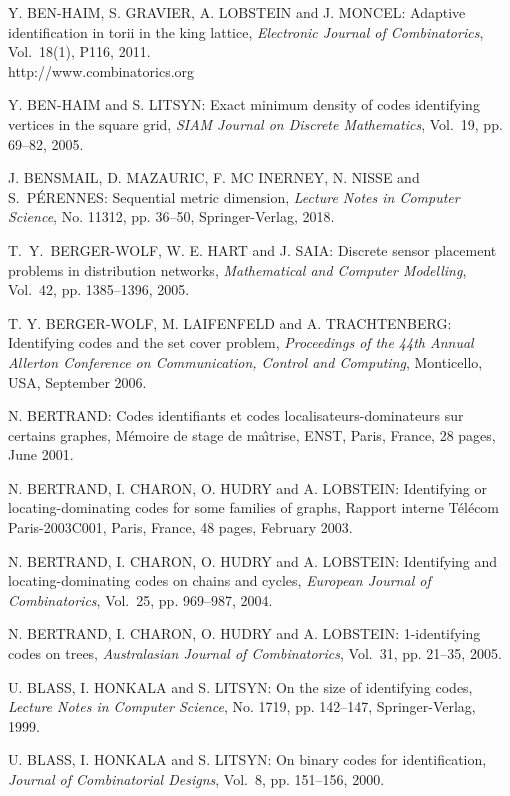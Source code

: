 \begin{thebibliography}{999}
Y. BEN-HAIM, S. GRAVIER, A. LOBSTEIN and J. MONCEL: Adaptive identification in torii in the king lattice, {\it Electronic Journal of Combinatorics}, Vol.~18(1), P116, 2011.\\
http://www.combinatorics.org

Y. BEN-HAIM and S. LITSYN: Exact minimum density of codes identifying vertices in the square grid, {\it SIAM Journal on Discrete Mathematics}, Vol.~19, pp. 69--82, 2005.

J. BENSMAIL, D. MAZAURIC, F. MC INERNEY, N. NISSE and S.~P\'E\-RENNES: Sequential metric dimension, {\it Lecture Notes in Computer Science}, No. 11312, pp. 36--50, Springer-Verlag, 2018.

%
T.~Y.~BERGER-WOLF, W. E. HART and J. SAIA: Discrete sensor placement problems in distribution networks, {\it Mathematical and Computer Modelling}, Vol.~42, pp. 1385--1396, 2005.

T. Y. BERGER-WOLF, M. LAIFENFELD and A. TRACHTENBERG: Identifying codes and the set cover problem, {\it Proceedings of the 44th Annual Allerton Conference on Communication, Control and Computing}, Monticello, USA, September 2006.

N. BERTRAND: Codes identifiants et codes localisateurs-dominateurs sur certains graphes, M\'emoire de stage de ma\^{\i}trise, ENST, Paris, France, 28 pages, June 2001.

N. BERTRAND, I. CHARON, O. HUDRY and A. LOBSTEIN: Identifying or locating-dominating codes for some families of graphs, Rapport interne T\'el\'ecom Paris-2003C001, Paris, France, 48 pages, February 2003.

N. BERTRAND, I. CHARON, O. HUDRY and A. LOBSTEIN: Identifying and locating-dominating codes on chains and cycles, {\it European Journal of Combinatorics}, Vol.~25, pp. 969--987, 2004.

N. BERTRAND, I. CHARON, O. HUDRY and A. LOBSTEIN: 1-identifying codes on trees, {\it Australasian Journal of Combinatorics}, Vol.~31, pp. 21--35, 2005.

U. BLASS, I. HONKALA and S. LITSYN: On the size of identifying codes, {\it Lecture Notes in Computer Science}, No. 1719, pp. 142--147, Springer-Verlag, 1999.

U. BLASS, I. HONKALA and S. LITSYN: On binary codes for identification, {\it Journal of Combinatorial Designs}, Vol.~8, pp. 151--156, 2000.


\end{thebibliography}
